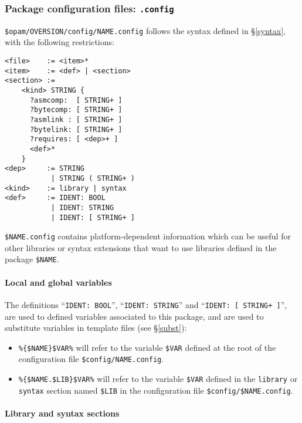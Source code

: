 \documentclass[a4paper,11pt]{article}
\begin{document}
\subsubsection{Package configuration files: {\tt .config}}
\label{dotconfig}

\verb+$opam/OVERSION/config/NAME.config+ follows the syntax defined in
\S\ref{syntax}, with the following restrictions:

{\small
\begin{Verbatim}[frame=single]
<file>    := <item>*
<item>    := <def> | <section>
<section> :=
    <kind> STRING {
      ?asmcomp:  [ STRING+ ]
      ?bytecomp: [ STRING+ ]
      ?asmlink : [ STRING+ ]
      ?bytelink: [ STRING+ ]
      ?requires: [ <dep>+ ]
      <def>*
    }
<dep>     := STRING 
           | STRING ( STRING+ )
<kind>    := library | syntax
<def>     := IDENT: BOOL
           | IDENT: STRING
           | IDENT: [ STRING+ ]
\end{Verbatim}
}

\verb+$NAME.config+ contains platform-dependent information which can
be useful for other libraries or syntax extensions that want to use
libraries defined in the package \verb+$NAME+.

\paragraph{Local and global variables}

The definitions ``{\tt IDENT: BOOL}'', ``{\tt IDENT: STRING}'' and ``{\tt IDENT:
  [ STRING+ ]}'', are used to defined variables associated to this
package, and are used to substitute variables in template files (see
\S\ref{subst}):

\begin{itemize}

\item \verb+%{$NAME}$VAR%+ will refer to the variable \verb+$VAR+
  defined at the root of the configuration file \verb+$config/NAME.config+.

\item \verb+%{$NAME.$LIB}$VAR%+ will refer to the variable \verb+$VAR+
  defined in the {\tt library} or {\tt syntax} section named
  \verb+$LIB+ in the configuration file \verb+$config/$NAME.config+.

\end{itemize}

\paragraph{Library and syntax sections}
\end{document}

